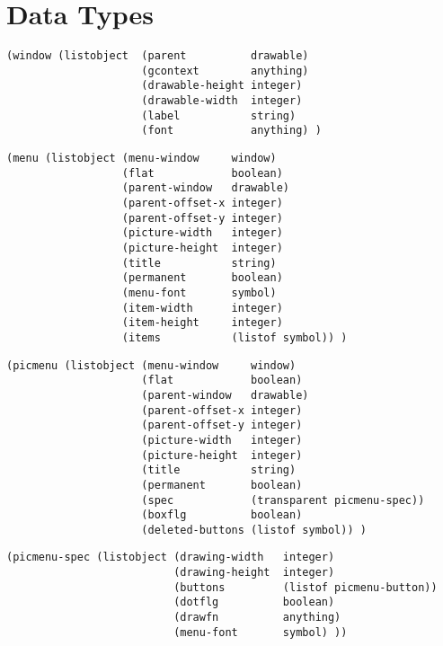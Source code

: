 \pagebreak

\section{Data Types}

\begin{verbatim}
(window (listobject  (parent          drawable)
                     (gcontext        anything)
                     (drawable-height integer)
                     (drawable-width  integer)
                     (label           string)
                     (font            anything) )
\end{verbatim}

\vspace*{-.2in}

\begin{verbatim}
(menu (listobject (menu-window     window)
                  (flat            boolean)
                  (parent-window   drawable)
                  (parent-offset-x integer)
                  (parent-offset-y integer)
                  (picture-width   integer)
                  (picture-height  integer)
                  (title           string)
                  (permanent       boolean)
                  (menu-font       symbol)
                  (item-width      integer)
                  (item-height     integer)
                  (items           (listof symbol)) )
\end{verbatim}

\vspace*{-.2in}

\begin{verbatim}
(picmenu (listobject (menu-window     window)
                     (flat            boolean)
                     (parent-window   drawable)
                     (parent-offset-x integer)
                     (parent-offset-y integer)
                     (picture-width   integer)
                     (picture-height  integer)
                     (title           string)
                     (permanent       boolean)
                     (spec            (transparent picmenu-spec))
                     (boxflg          boolean)
                     (deleted-buttons (listof symbol)) )
\end{verbatim}

\vspace*{-.2in}

\begin{verbatim}
(picmenu-spec (listobject (drawing-width   integer)
                          (drawing-height  integer)
                          (buttons         (listof picmenu-button))
                          (dotflg          boolean)
                          (drawfn          anything)
                          (menu-font       symbol) ))
\end{verbatim}

